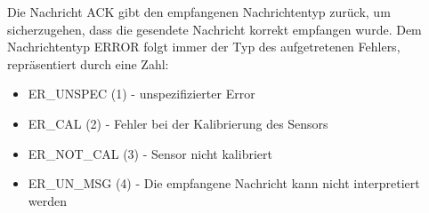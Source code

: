 Die Nachricht ACK gibt den empfangenen Nachrichtentyp zurück, um sicherzugehen, dass die gesendete Nachricht korrekt empfangen wurde.
Dem Nachrichtentyp ERROR folgt immer der Typ des aufgetretenen Fehlers, repräsentiert durch eine Zahl:

\begin{itemize}
    \item ER\_UNSPEC (1) - unspezifizierter Error
    \item ER\_CAL (2) - Fehler bei der Kalibrierung des Sensors
    \item ER\_NOT\_CAL (3) - Sensor nicht kalibriert
    \item ER\_UN\_MSG (4) - Die empfangene Nachricht kann nicht interpretiert werden
\end{itemize}